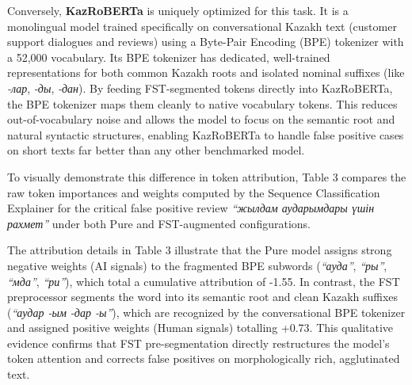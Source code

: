 \documentclass[runningheads]{llncs}
\begin{document}
Conversely, \textbf{KazRoBERTa} is uniquely optimized for this task. It is a monolingual model trained specifically on conversational Kazakh text (customer support dialogues and reviews) using a Byte-Pair Encoding (BPE) tokenizer with a 52,000 vocabulary. Its BPE tokenizer has dedicated, well-trained representations for both common Kazakh roots and isolated nominal suffixes (like \textit{-лар}, \textit{-ды}, \textit{-дан}). By feeding FST-segmented tokens directly into KazRoBERTa, the BPE tokenizer maps them cleanly to native vocabulary tokens. This reduces out-of-vocabulary noise and allows the model to focus on the semantic root and natural syntactic structures, enabling KazRoBERTa to handle false positive cases on short texts far better than any other benchmarked model.

To visually demonstrate this difference in token attribution, Table 3 compares the raw token importances and weights computed by the Sequence Classification Explainer for the critical false positive review \textit{``жылдам аударымдары үшін рахмет''} under both Pure and FST-augmented configurations.

\begin{table}[htbp]
\caption{Detailed Token Attribution Comparison for ``жылдам аударымдары үшін рахмет'' (Pure vs. FST)}
\label{tab:table3}
\centering
{}
\end{table}

The attribution details in Table 3 illustrate that the Pure model assigns strong negative weights (AI signals) to the fragmented BPE subwords (\textit{``ауда''}, \textit{``ры''}, \textit{``мда''}, \textit{``ри''}), which total a cumulative attribution of -1.55. In contrast, the FST preprocessor segments the word into its semantic root and clean Kazakh suffixes (\textit{``аудар -ым -дар -ы''}), which are recognized by the conversational BPE tokenizer and assigned positive weights (Human signals) totalling +0.73. This qualitative evidence confirms that FST pre-segmentation directly restructures the model's token attention and corrects false positives on morphologically rich, agglutinated text.
\end{document}
